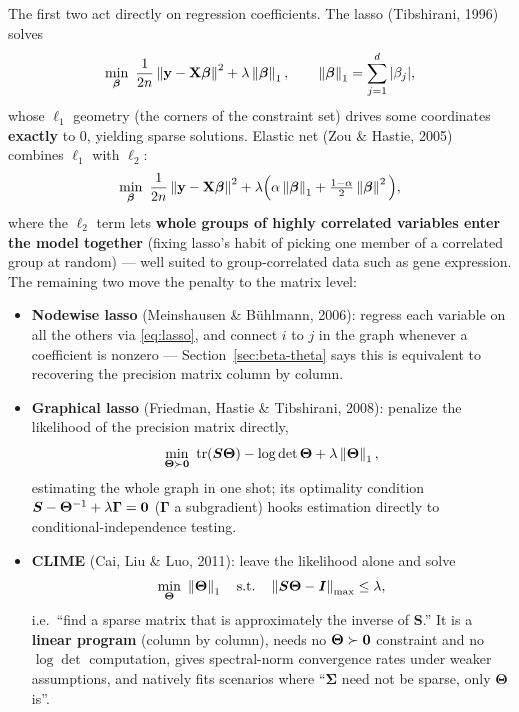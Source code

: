 The first two act directly on regression coefficients. The lasso (Tibshirani, 1996) solves
\begin{equation}\label{eq:lasso}
  \min_{\bm{\beta}} \ \frac{1}{2n} \left\lVert \mathbf{y} - \mathbf{X} \bm{\beta} \right\rVert^2 + \lambda \left\lVert \bm{\beta} \right\rVert_1 ,
  \qquad
  \left\lVert \bm{\beta} \right\rVert_1 = \sum_{j=1}^d |\beta_j| ,
\end{equation}
whose $\ell_1$ geometry (the corners of the constraint set) drives some coordinates \textbf{exactly} to $0$, yielding sparse solutions. Elastic net (Zou \& Hastie, 2005) combines $\ell_1$ with $\ell_2$:
\begin{equation}\label{eq:enet}
  \min_{\bm{\beta}} \ \frac{1}{2n} \left\lVert \mathbf{y} - \mathbf{X} \bm{\beta} \right\rVert^2 + \lambda \Big( \alpha \left\lVert \bm{\beta} \right\rVert_1 + \tfrac{1-\alpha}{2} \left\lVert \bm{\beta} \right\rVert^2 \Big),
\end{equation}
where the $\ell_2$ term lets \textbf{whole groups of highly correlated variables enter the model together} (fixing lasso's habit of picking one member of a correlated group at random) — well suited to group-correlated data such as gene expression. The remaining two move the penalty to the matrix level:

\begin{itemize}
  \item \textbf{Nodewise lasso} (Meinshausen \& B\"uhlmann, 2006): regress each variable on all the others via \eqref{eq:lasso}, and connect $i$ to $j$ in the graph whenever a coefficient is nonzero — Section~\ref{sec:beta-theta} says this is equivalent to recovering the precision matrix column by column\cite{tibshirani1996,meinshausen2006}.
  \item \textbf{Graphical lasso} (Friedman, Hastie \& Tibshirani, 2008): penalize the likelihood of the precision matrix directly,
  \[
    \min_{\bm{\Theta} \succ \zero} \ \trace(\bm{S}\bm{\Theta}) - \log\det \bm{\Theta} + \lambda \norm{\bm{\Theta}}_1 ,
  \]
  estimating the whole graph in one shot; its optimality condition $\bm{S} - \bm{\Theta}^{-1} + \lambda \bm{\Gamma} = \mathbf{0}$ ($\bm{\Gamma}$ a subgradient) hooks estimation directly to conditional-independence testing\cite{friedman2008}.
  \item \textbf{CLIME} (Cai, Liu \& Luo, 2011): leave the likelihood alone and solve
  \[
    \min_{\bm{\Theta}} \ \left\lVert \bm{\Theta} \right\rVert_1 \quad \text{s.t.} \quad \left\lVert  \bm{S}\bm{\Theta} - \bm{I}  \right\rVert_{\max} \le \lambda ,
  \]
  i.e.\ ``find a sparse matrix that is approximately the inverse of $\bm{S}$.'' It is a \textbf{linear program} (column by column), needs no $\bm{\Theta} \succ \mathbf{0}$ constraint and no $\log\det$ computation, gives spectral-norm convergence rates under weaker assumptions, and natively fits scenarios where ``$\bm{\Sigma}$ need not be sparse, only $\bm{\Theta}$ is''\cite{cai2011}.
\end{itemize}

